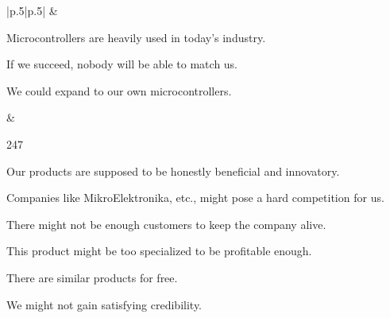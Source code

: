 \documentclass[a4paper,twoside,15pt]{book}
\begin{document}
\begin{table}[h!]
\begin{tabular}{|p{}|p{}|}
					&  \\

				\begin{dinglist}{73}
					\setlength{\itemsep}{-3pt}
					\item Microcontrollers are heavily used in today's industry.
					\item If we succeed, nobody will be able to match us.
					\item We could expand to our own microcontrollers.
				\end{dinglist}	&

				\begin{dinglist}{247}
					\setlength{\itemsep}{-3pt}
					\item Our products are supposed to be honestly beneficial and innovatory.
					\item Companies like MikroElektronika, etc., might pose a hard competition for us.
					\item There might not be enough customers to keep the company alive.
					\item This product might be too specialized to be profitable enough.
					\item There are similar products for free.
					\item We might not gain satisfying credibility.
				\end{dinglist}	\\
				\hline
			\end{tabular}
			\caption{SWOT analysis}
		\end{table}
\end{document}
